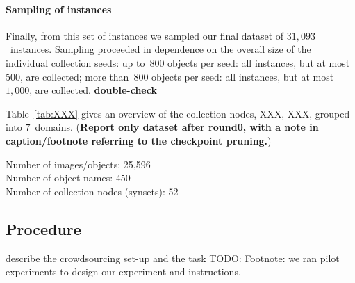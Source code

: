 \paragraph{Sampling of instances}
Finally, from this set of instances we sampled our final dataset of $31,093$~instances. 
Sampling proceeded in dependence on the overall size of the individual collection seeds: 
up to~$800$ objects per seed: all instances, but at most 500, are collected; more than~$800$ objects per seed: all instances, but at most~$1,000$, are collected.  \textbf{double-check}


Table~\ref{tab:XXX} gives an overview of the collection nodes, XXX, XXX, grouped into $7$~domains. (\textbf{Report only dataset after round0, with a note in caption/footnote referring to the checkpoint pruning.})

Number of images/objects:        25,596\\
Number of object names:  450\\
Number of collection nodes (synsets):    52 \\

\subsection{Procedure} describe the crowdsourcing set-up and the task
TODO: Footnote: we ran pilot experiments to design our experiment and instructions.
